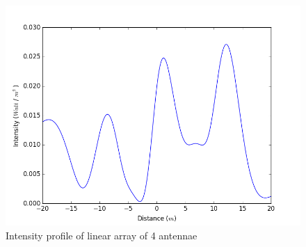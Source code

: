 \begin{figure}[!h]
	\centering	
	\includegraphics[scale=0.45]{figure_4.png}
	\caption{Intensity profile of linear array of 4 antennae}
\end{figure}
